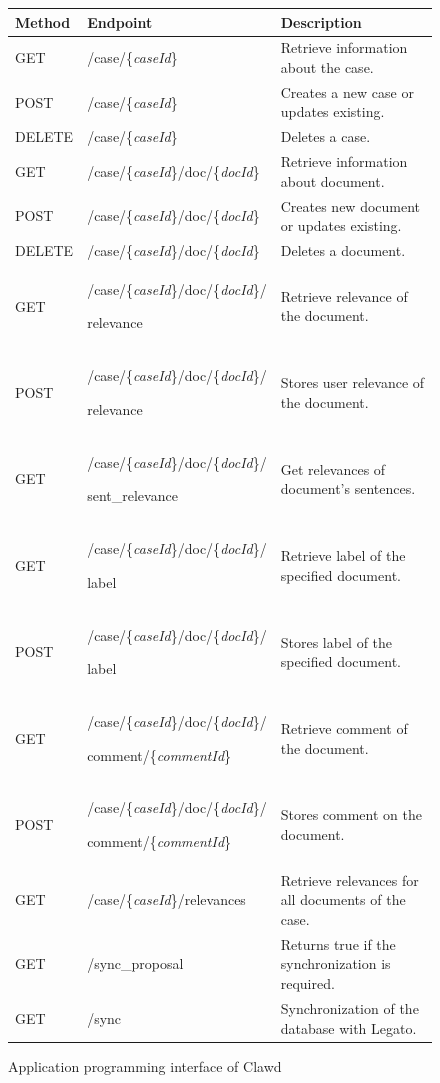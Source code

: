 \documentclass[
  digital, %
  notable,   %
  nolof,     %
  nolot,     %
  draft
]{fithesis3}
\begin{document}
\begin{figure}[h]
\centering
\caption{Application programming interface of Clawd}
\label{fig:api}
\begin{tabular}{|m{2cm}|m{5.5cm}|m{5cm}|}
\hline
\rowcolor{gray!30}
\textbf{Method} &  \textbf{Endpoint}   &  \vspace{0.2cm} \textbf{Description}   \\[10pt] \hline
GET  &  /case/\{\textit{caseId}\} & Retrieve information about the case. \\ \hline
POST  & /case/\{\textit{caseId}\} & Creates a new case or updates existing. \\ \hline
DELETE  & /case/\{\textit{caseId}\} & Deletes a case.  \\[6pt] \hline
GET  & /case/\{\textit{caseId}\}/doc/\{\textit{docId}\} & Retrieve information about document. \\ \hline
POST  & /case/\{\textit{caseId}\}/doc/\{\textit{docId}\} & Creates new document or updates existing. \\ \hline
DELETE  & /case/\{\textit{caseId}\}/doc/\{\textit{docId}\} & Deletes a document. \\[6pt] \hline
GET  & /case/\{\textit{caseId}\}/doc/\{\textit{docId}\}/\par relevance & Retrieve relevance of the document. \\ \hline
POST  & /case/\{\textit{caseId}\}/doc/\{\textit{docId}\}/\par relevance & Stores user relevance of the document.\\ \hline
GET  & /case/\{\textit{caseId}\}/doc/\{\textit{docId}\}/\par sent\_relevance & Get relevances of document's sentences.\\ \hline
GET  & /case/\{\textit{caseId}\}/doc/\{\textit{docId}\}/\par label & Retrieve label of the specified document. \\ \hline
POST  & /case/\{\textit{caseId}\}/doc/\{\textit{docId}\}/\par label & Stores label of the specified document. \\ \hline
GET  & /case/\{\textit{caseId}\}/doc/\{\textit{docId}\}/\par comment/\{\textit{commentId}\} & Retrieve comment of the document. \\ \hline
POST  & /case/\{\textit{caseId}\}/doc/\{\textit{docId}\}/\par comment/\{\textit{commentId}\} & Stores comment on the document. \\ \hline
GET  & /case/\{\textit{caseId}\}/relevances & Retrieve relevances for all documents of the case. \\ \hline
GET  & /sync\_proposal & Returns true if the synchronization is required. \\ \hline
GET  & /sync & Synchronization of the database with Legato. \\ \hline
\end{tabular}
\end{figure}
\end{document}
